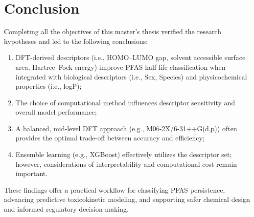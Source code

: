 
\chapter{Conclusion}

\label{Chapter6}

\newcommand{\keyword}[1]{\textbf{#1}}
\newcommand{\tabhead}[1]{\textbf{#1}}
\newcommand{\code}[1]{\texttt{#1}}
\newcommand{\file}[1]{\texttt{\bfseries#1}}
\newcommand{\option}[1]{\texttt{\itshape#1}}
\renewcommand{\figurename}{Figure.}
\renewcommand{\tablename}{Table.}

Completing all the objectives of this master's thesis verified the research hypotheses and led to the following conclusions:

\begin{enumerate}
  \item DFT-derived descriptors (i.e., HOMO–LUMO gap, solvent accessible surface area, Hartree–Fock energy) improve PFAS half-life classification when integrated with biological descriptors (i.e., Sex, Species) and physicochemical properties (i.e., logP);
  
  \item The choice of computational method influences descriptor sensitivity and overall model performance;
  
  \item A balanced, mid-level DFT approach (e.g., M06-2X/6-31++G(d,p)) often provides the optimal trade-off between accuracy and efficiency;
  
  \item Ensemble learning (e.g., XGBoost) effectively utilizes the descriptor set; however, considerations of interpretability and computational cost remain important.
\end{enumerate}

These findings offer a practical workflow for classifying PFAS persistence, advancing predictive toxicokinetic modeling, and supporting safer chemical design and informed regulatory decision-making.

